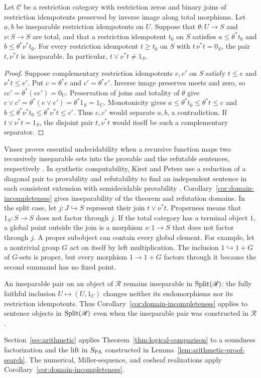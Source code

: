 \begin{corollary}\label{cor:domain-incompleteness}
Let $\mathcal C$ be a restriction category with restriction zeros and
binary joins of restriction idempotents preserved by inverse image along total morphisms.
Let $a,b$ be inseparable restriction idempotents on $U$. Suppose that
$\theta:U\to S$ and $\nu:S\to S$ are total, and that a restriction
idempotent $t_0$ on $S$ satisfies $a\le\theta^*t_0$ and
$b\le\theta^*\nu^*t_0$.
For every restriction idempotent $t\ge t_0$ on $S$ with $t\,\nu^*t=0_S$,
the pair $t,\nu^*t$ is inseparable. In particular,
$t\vee\nu^*t\ne1_S$.
\end{corollary}
\begin{proof}
Suppose complementary restriction idempotents $e,e'$ on $S$ satisfy
$t\le e$ and $\nu^*t\le e'$. Put
$c=\theta^*e$ and $c'=\theta^*e'$. Inverse image preserves
meets and zero, so $cc'=\theta^*(ee')=0_U$.
Preservation of joins and totality of $\theta$ give
$c\vee c'=\theta^*(e\vee e')=\theta^*1_S=1_U$.
Monotonicity gives
$a\le\theta^*t_0\le\theta^*t\le c$ and
$b\le\theta^*\nu^*t_0\le\theta^*\nu^*t\le c'$.
Thus $c,c'$ would separate $a,b$, a contradiction.
If $t\vee\nu^*t=1_S$, the disjoint pair $t,\nu^*t$ would
itself be such a complementary separator.
\end{proof}

Visser proves essential undecidability when a recursive function maps
two recursively inseparable sets into the provable and the refutable
sentences, respectively \cite[Lemma~23]{VisserEHU}.
In synthetic computability, Kirst and Peters use a reduction of a
diagonal pair to provability and refutability to find an independent
sentence in each consistent extension with semidecidable provability
\cite[Definitions~7, 17 and Theorem~20]{KirstPeters}.
Corollary~\ref{cor:domain-incompleteness} gives inseparability of
the theorem and refutation domains. In the split case, let
$j:J\hookrightarrow S$ represent their join $t\vee\nu^*t$.
Properness means that $1_S:S\to S$ does not factor through $j$.
If the total category has a terminal object $1$, a global point
outside the join is a morphism $s:1\to S$ that does not factor
through $j$. A proper subobject can contain every global element. For
example, let a nontrivial group $G$ act on itself by left
multiplication. The inclusion $1\hookrightarrow 1+G$ of $G$-sets is
proper, but every morphism $1\to 1+G$ factors through it because the
second summand has no fixed point.

An inseparable pair on an object of $\mathscr R$ remains inseparable
in $\operatorname{Split}(\mathscr R)$: the fully faithful inclusion
$U\mapsto(U,1_U)$ changes neither its endomorphisms nor its
restriction idempotents. Thus
Corollary~\ref{cor:domain-incompleteness} applies to sentence
objects in $\operatorname{Split}(\mathscr R)$ even when the inseparable pair was
constructed in $\mathscr R$.

Section~\ref{sec:arithmetic} applies
Theorem~\ref{thm:logical-comparison} to a soundness factorization
and the lift in $S_{\mathrm{PA}}$ constructed in
Lemma~\ref{lem:arithmetic-proof-search}.
The numerical, Miller-sequence, and cosheaf realizations apply
Corollary~\ref{cor:domain-incompleteness}.


